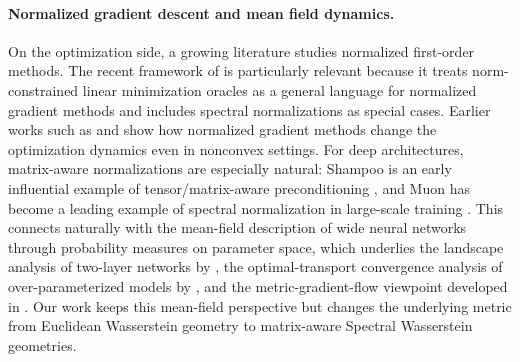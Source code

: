 \documentclass{article}
\begin{document}
\paragraph{Normalized gradient descent and mean field dynamics.}
On the optimization side, a growing literature studies normalized first-order methods. The recent framework of \citet{PethickXieAntonakopoulosEtAl2025} is particularly relevant because it treats norm-constrained linear minimization oracles as a general language for normalized gradient methods and includes spectral normalizations as special cases. Earlier works such as \citet{CutkoskyMehta2020} and \citet{MurraySwensonKar2019} show how normalized gradient methods change the optimization dynamics even in nonconvex settings. For deep architectures, matrix-aware normalizations are especially natural: Shampoo is an early influential example of tensor/matrix-aware preconditioning \citep{GuptaKorenSinger2018}, and Muon has become a leading example of spectral normalization in large-scale training \citep{KellerJordan2024,LiuSuYaoEtAl2025}. This connects naturally with the mean-field description of wide neural networks through probability measures on parameter space, which underlies the landscape analysis of two-layer networks by \citet{MeiMontanariNguyen2018}, the optimal-transport convergence analysis of over-parameterized models by \citet{ChizatBach2018}, and the metric-gradient-flow viewpoint developed in \citet{AmbrosioGigliSavare2008}. Our work keeps this mean-field perspective but changes the underlying metric from Euclidean Wasserstein geometry to matrix-aware Spectral Wasserstein geometries.
\end{document}

